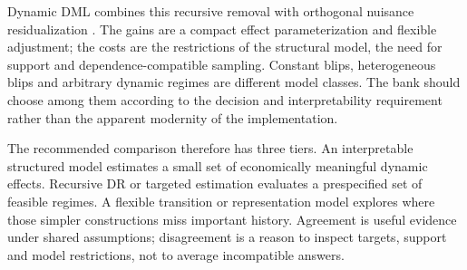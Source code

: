 Dynamic DML combines this recursive removal with orthogonal nuisance
residualization \citep{dynamicdml2021}. The gains are a compact effect
parameterization and flexible adjustment; the costs are the restrictions
of the structural model, the need for support and dependence-compatible
sampling. Constant blips, heterogeneous blips and arbitrary dynamic regimes
are different model classes. The bank should choose among them according
to the decision and interpretability requirement rather than the apparent
modernity of the implementation.

The recommended comparison therefore has three tiers. An interpretable
structured model estimates a small set of economically meaningful dynamic
effects. Recursive DR or targeted estimation evaluates a prespecified set
of feasible regimes. A flexible transition or representation model explores
where those simpler constructions miss important history. Agreement is
useful evidence under shared assumptions; disagreement is a reason to
inspect targets, support and model restrictions, not to average incompatible
answers.

